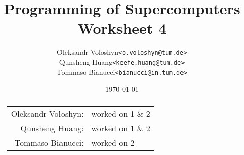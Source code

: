 \documentclass{article}
\title{Programming of Supercomputers\\Worksheet 4}
\author{
	\begin{tabular}{rl}
		Oleksandr Voloshyn& \texttt{<o.voloshyn@tum.de>}\\ 
		Qunsheng Huang& \texttt{<keefe.huang@tum.de>}\\ 
		Tommaso Bianucci& \texttt{<bianucci@in.tum.de>}
	\end{tabular}
}
\date{\today}
\begin{document}
\maketitle
\renewcommand{\abstractname}{Group members's contributions}
\begin{abstract}
	\begin{center}
		\begin{tabular}{rl}
		Oleksandr Voloshyn:& worked on 1 \& 2\\
		Qunsheng Huang:& worked on 1 \& 2\\
		Tommaso Bianucci:& worked on 2\\
		\end{tabular}
	\end{center}
\end{abstract}



\end{document}
